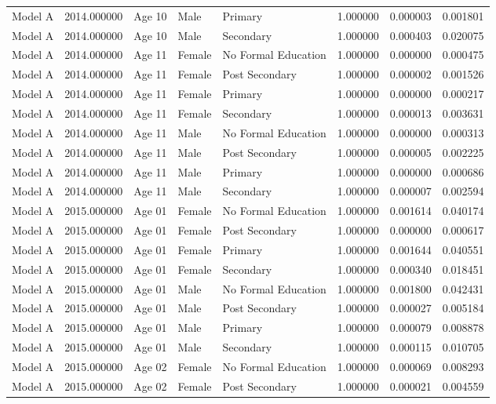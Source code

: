 \begin{table}[ht]
\begin{tabular}{lrlllrrr}
Model A & 2014.000000 & Age 10 & Male & Primary & 1.000000 & 0.000003 & 0.001801 \\
Model A & 2014.000000 & Age 10 & Male & Secondary & 1.000000 & 0.000403 & 0.020075 \\
Model A & 2014.000000 & Age 11 & Female & No Formal Education & 1.000000 & 0.000000 & 0.000475 \\
Model A & 2014.000000 & Age 11 & Female & Post Secondary & 1.000000 & 0.000002 & 0.001526 \\
Model A & 2014.000000 & Age 11 & Female & Primary & 1.000000 & 0.000000 & 0.000217 \\
Model A & 2014.000000 & Age 11 & Female & Secondary & 1.000000 & 0.000013 & 0.003631 \\
Model A & 2014.000000 & Age 11 & Male & No Formal Education & 1.000000 & 0.000000 & 0.000313 \\
Model A & 2014.000000 & Age 11 & Male & Post Secondary & 1.000000 & 0.000005 & 0.002225 \\
Model A & 2014.000000 & Age 11 & Male & Primary & 1.000000 & 0.000000 & 0.000686 \\
Model A & 2014.000000 & Age 11 & Male & Secondary & 1.000000 & 0.000007 & 0.002594 \\
Model A & 2015.000000 & Age 01 & Female & No Formal Education & 1.000000 & 0.001614 & 0.040174 \\
Model A & 2015.000000 & Age 01 & Female & Post Secondary & 1.000000 & 0.000000 & 0.000617 \\
Model A & 2015.000000 & Age 01 & Female & Primary & 1.000000 & 0.001644 & 0.040551 \\
Model A & 2015.000000 & Age 01 & Female & Secondary & 1.000000 & 0.000340 & 0.018451 \\
Model A & 2015.000000 & Age 01 & Male & No Formal Education & 1.000000 & 0.001800 & 0.042431 \\
Model A & 2015.000000 & Age 01 & Male & Post Secondary & 1.000000 & 0.000027 & 0.005184 \\
Model A & 2015.000000 & Age 01 & Male & Primary & 1.000000 & 0.000079 & 0.008878 \\
Model A & 2015.000000 & Age 01 & Male & Secondary & 1.000000 & 0.000115 & 0.010705 \\
Model A & 2015.000000 & Age 02 & Female & No Formal Education & 1.000000 & 0.000069 & 0.008293 \\
Model A & 2015.000000 & Age 02 & Female & Post Secondary & 1.000000 & 0.000021 & 0.004559 \\

\end{tabular}
\end{table}

